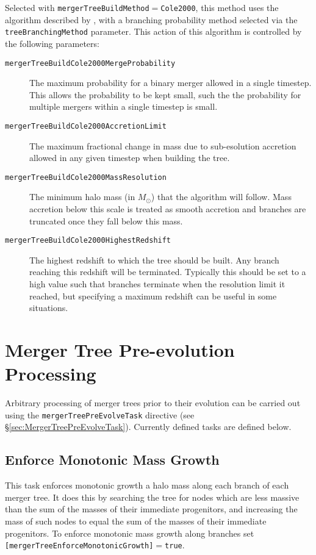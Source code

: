 Selected with {\tt mergerTreeBuildMethod}$=${\tt Cole2000}, this method uses the algorithm described by \cite{cole_hierarchical_2000}, with a branching probability method selected via the {\tt treeBranchingMethod} parameter. This action of this algorithm is controlled by the following parameters:
\begin{description}
 \item [{\tt mergerTreeBuildCole2000MergeProbability}] The maximum probability for a binary merger allowed in a single timestep. This allows the probability to be kept small, such the the probability for multiple mergers within a single timestep is small.
 \item [{\tt mergerTreeBuildCole2000AccretionLimit}] The maximum fractional change in mass due to sub-esolution accretion allowed in any given timestep when building the tree.
 \item [{\tt mergerTreeBuildCole2000MassResolution}] The minimum halo mass (in $M_\odot$) that the algorithm will follow. Mass accretion below this scale is treated as smooth accretion and branches are truncated once they fall below this mass.
 \item [{\tt mergerTreeBuildCole2000HighestRedshift}] The highest redshift to which the tree should be built. Any branch reaching this redshift will be terminated. Typically this should be set to a high value such that branches terminate when the resolution limit it reached, but specifying a maximum redshift can be useful in some situations.
\end{description}

\section{Merger Tree Pre-evolution Processing}

Arbitrary processing of merger trees prior to their evolution can be carried out using the {\tt mergerTreePreEvolveTask} directive (see \S\ref{sec:MergerTreePreEvolveTask}). Currently defined tasks are defined below.

\subsection{Enforce Monotonic Mass Growth}

This task enforces monotonic growth a halo mass along each branch of each merger tree. It does this by searching the tree for nodes which are less massive than the sum of the masses of their immediate progenitors, and increasing the mass of such nodes to equal the sum of the masses of their immediate progenitors. To enforce monotonic mass growth along branches set {\tt [mergerTreeEnforceMonotonicGrowth]}$=${\tt true}.

